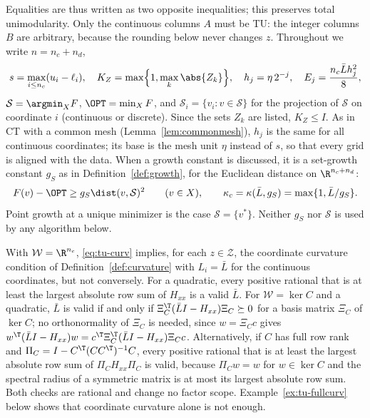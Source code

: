 Equalities are thus written as two opposite inequalities; this preserves
total unimodularity. Only the continuous columns $A$ must be TU: the integer
columns $B$ are arbitrary, because the rounding below never changes $z$.
Throughout we write $n=n_c+n_d$,
\[
s=\max_{i\le n_c}(u_i-\ell_i),\quad K_Z=\max\Bigl\{1,\max_k\abs{Z_k}\Bigr\},\quad
h_j=\eta\,2^{-j},\quad E_j=\frac{n_c\bar L h_j^2}{8},
\]
$\mathcal S=\argmin_XF$, $\OPT=\min_XF$, and
$\mathcal S_i=\{v_i:v\in\mathcal S\}$ for the projection of $\mathcal S$ on
coordinate $i$ (continuous or discrete). Since the sets $Z_k$ are listed,
$K_Z\le I$. As in CT with a common mesh (Lemma~\ref{lem:commonmesh}), $h_j$
is the same for all continuous coordinates; its base is the mesh unit $\eta$
instead of $s$, so that every grid is aligned with the data. When a growth
constant is discussed, it is a
set-growth constant $g_S$ as in Definition~\ref{def:growth}, for the
Euclidean distance on $\R^{n_c+n_d}$:
\begin{equation}\label{eq:tu-setgrowth}
F(v)-\OPT\ge g_S\dist(v,\mathcal S)^2\qquad(v\in X),\qquad
\kappa_c=\kappa(\bar L,g_S)=\max\{1,\bar L/g_S\}.
\end{equation}
Point growth at a unique minimizer is the case $\mathcal S=\{v^*\}$. Neither
$g_S$ nor $\mathcal S$ is used by any algorithm below.

\begin{remark}\label{rem:tu-curv}
With $\mathcal W=\R^{n_c}$, \eqref{eq:tu-curv} implies, for each
$z\in\mathcal Z$, the coordinate curvature condition of
Definition~\ref{def:curvature} with $L_i=\bar L$ for the continuous
coordinates, but not conversely. For a quadratic, every positive rational
that is at least the largest absolute row sum of $H_{xx}$ is a valid
$\bar L$. For $\mathcal W=\ker C$ and a quadratic, $\bar L$ is valid if and
only if $\Xi_C^{\T}(\bar LI-H_{xx})\Xi_C\succeq0$ for a basis matrix $\Xi_C$
of $\ker C$; no orthonormality of $\Xi_C$ is needed, since $w=\Xi_Cc$ gives
$w^{\T}(\bar LI-H_{xx})w=c^{\T}\Xi_C^{\T}(\bar LI-H_{xx})\Xi_Cc$.
Alternatively, if $C$ has full row rank and
$\Pi_C=I-C^{\T}(CC^{\T})^{-1}C$, every positive rational that is at least
the largest absolute row sum of $\Pi_CH_{xx}\Pi_C$ is valid, because
$\Pi_Cw=w$ for $w\in\ker C$ and the spectral radius of a symmetric matrix is
at most its largest absolute row sum. Both checks are rational and change no
factor scope. Example~\ref{ex:tu-fullcurv} below shows that coordinate
curvature alone is not enough.
\end{remark}

